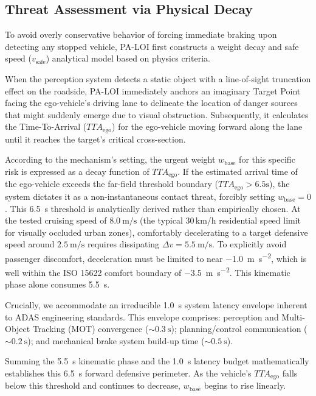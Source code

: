 \documentclass[conference]{IEEEtran}
\begin{document}
\subsection{Threat Assessment via Physical Decay}
To avoid overly conservative behavior of forcing immediate braking upon detecting any stopped vehicle, PA-LOI first constructs a weight decay and safe speed ($v_{\text{safe}}$) analytical model based on physics criteria.

When the perception system detects a static object with a line-of-sight truncation effect on the roadside, PA-LOI immediately anchors an imaginary Target Point facing the ego-vehicle's driving lane to delineate the location of danger sources that might suddenly emerge due to visual obstruction. Subsequently, it calculates the Time-To-Arrival ($TTA_{\text{ego}}$) for the ego-vehicle moving forward along the lane until it reaches the target's critical cross-section.

According to the mechanism's setting, the urgent weight $w_{\text{base}}$ for this specific risk is expressed as a decay function of $TTA_{\text{ego}}$. If the estimated arrival time of the ego-vehicle exceeds the far-field threshold boundary ($TTA_{\text{ego}} > 6.5\text{s}$), the system dictates it as a non-instantaneous contact threat, forcibly setting $w_{\text{base}} = 0$. This \SI{6.5}{\second} threshold is analytically derived rather than empirically chosen. At the tested cruising speed of $\SI{8.0}{\meter\per\second}$ (the typical 30\,km/h residential speed limit for visually occluded urban zones), comfortably decelerating to a target defensive speed around $\SI{2.5}{\meter\per\second}$ requires dissipating $\Delta v = \SI{5.5}{\meter\per\second}$. To explicitly avoid passenger discomfort, deceleration must be limited to near \SI{-1.0}{\meter\per\second\squared}, which is well within the ISO 15622 comfort boundary of \SI{-3.5}{\meter\per\second\squared}. This kinematic phase alone consumes \SI{5.5}{\second}.

Crucially, we accommodate an irreducible \SI{1.0}{\second} system latency envelope inherent to ADAS engineering standards. This envelope comprises: perception and Multi-Object Tracking (MOT) convergence ($\sim\SI{0.3}{\second}$); planning/control communication ($\sim\SI{0.2}{\second}$); and mechanical brake system build-up time ($\sim\SI{0.5}{\second}$).

Summing the \SI{5.5}{\second} kinematic phase and the \SI{1.0}{\second} latency budget mathematically establishes this \SI{6.5}{\second} forward defensive perimeter. As the vehicle's $TTA_{\text{ego}}$ falls below this threshold and continues to decrease, $w_{\text{base}}$ begins to rise linearly.
\end{document}
